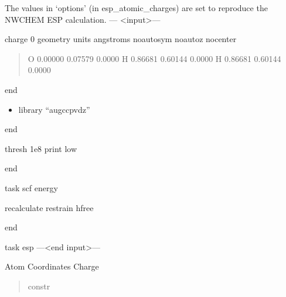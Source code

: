 \documentclass[letterpaper,10pt,english]{sphinxmanual}
\begin{document}
\begin{fulllineitems}
\label{\detokenize{fcdft.solvent:fcdft.solvent.esp.ang2bohr}}
\pysigstartsignatures
\pysigline
{}
\pysigstopsignatures
\sphinxAtStartPar
The values in ‘options’ (in esp\_atomic\_charges) are set to reproduce the NWCHEM ESP calculation.
— \textless{}input\textgreater{}—

\sphinxAtStartPar
charge    0
geometry units angstroms noautosym noautoz nocenter
\begin{quote}

\sphinxAtStartPar
O   0.00000      \sphinxhyphen{}0.07579       0.0000
H   0.86681       0.60144       0.0000
H  \sphinxhyphen{}0.86681       0.60144       0.0000
\end{quote}

\sphinxAtStartPar
end
\begin{description}
\begin{itemize}
\item {} 
\sphinxAtStartPar
library “aug\sphinxhyphen{}cc\sphinxhyphen{}pvdz”

\end{itemize}

\end{description}

\sphinxAtStartPar
end
\begin{description}
\sphinxAtStartPar
thresh 1e\sphinxhyphen{}8
print low

\end{description}

\sphinxAtStartPar
end

\sphinxAtStartPar
task scf       energy
\begin{description}
\sphinxAtStartPar
recalculate
restrain hfree

\end{description}

\sphinxAtStartPar
end

\sphinxAtStartPar
task esp
—\textless{}end input\textgreater{}—\textendash{}
\begin{description}
\sphinxAtStartPar
Atom              Coordinates                           Charge
\begin{quote}
\begin{description}
\sphinxAtStartPar
constr


\end{description}
\end{quote}
\end{description}
\end{fulllineitems}
\end{document}
